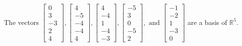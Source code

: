 \begin{exercise}
\begin{exerciseStatement}
  \end{exerciseStatement}
  \begin{exerciseAnswer}
   The vectors \(\left[\begin{array}{r}
0 \\
3 \\
-3 \\
2 \\
4
\end{array}\right] , \left[\begin{array}{r}
4 \\
-5 \\
-4 \\
-4 \\
4
\end{array}\right] , \left[\begin{array}{r}
4 \\
-4 \\
1 \\
-4 \\
-3
\end{array}\right] , \left[\begin{array}{r}
-5 \\
3 \\
0 \\
-5 \\
2
\end{array}\right] , \text{ and } \left[\begin{array}{r}
-1 \\
-2 \\
1 \\
-3 \\
0
\end{array}\right]\) 
  	 are  a basis of \(\mathbb{R}^5\).
  


  \end{exerciseAnswer}
\end{exercise}